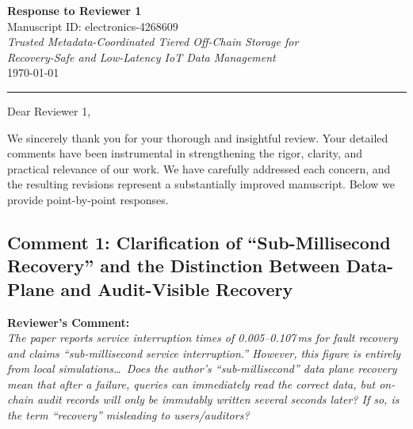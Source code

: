 \documentclass[11pt,a4paper]{article}
\newcommand{\reviewercomment}[1]{%
  \vspace{6pt}\noindent\textbf{\textcolor{reviewercolor}{Reviewer's Comment:}}\\
  \textcolor{reviewercolor}{\itshape #1}\vspace{4pt}}
\begin{document}
\begin{center}
{\LARGE\bfseries Response to Reviewer 1}\\[12pt]
{\large Manuscript ID: electronics-4268609}\\[6pt]
{\large\itshape Trusted Metadata-Coordinated Tiered Off-Chain Storage for\\
Recovery-Safe and Low-Latency IoT Data Management}\\[12pt]
\today
\end{center}

\noindent\rule{\textwidth}{0.4pt}

\vspace{8pt}
\noindent Dear Reviewer 1,

\vspace{4pt}
\noindent We sincerely thank you for your thorough and insightful review. Your detailed comments have been instrumental in strengthening the rigor, clarity, and practical relevance of our work. We have carefully addressed each concern, and the resulting revisions represent a substantially improved manuscript. Below we provide point-by-point responses.

\vspace{12pt}

\subsection*{Comment 1: Clarification of ``Sub-Millisecond Recovery'' and the Distinction Between Data-Plane and Audit-Visible Recovery}

\reviewercomment{The paper reports service interruption times of 0.005--0.107\,ms for fault recovery and claims ``sub-millisecond service interruption.'' However, this figure is entirely from local simulations\ldots\ Does the author's ``sub-millisecond'' data plane recovery mean that after a failure, queries can immediately read the correct data, but on-chain audit records will only be immutably written several seconds later? If so, is the term ``recovery'' misleading to users/auditors?}
\end{document}
